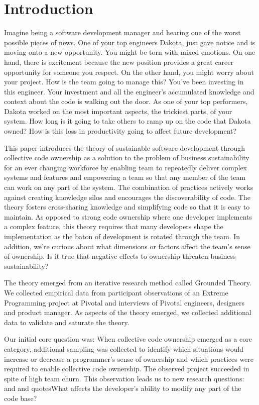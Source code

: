 
\section{Introduction}

Imagine being a software development manager and hearing one of the worst possible pieces of news.  One of your top engineers Dakota, just gave notice and is moving onto a new opportunity. You might be torn with mixed emotions. On one hand, there is excitement because the new position provides a great career opportunity for someone you respect. On the other hand, you might worry about your project. How is the team going to manage this? You've been investing in this engineer. Your investment and all the engineer's accumulated knowledge and context about the code is walking out the door.  As one of your top performers, Dakota worked on the most important aspects, the trickiest parts, of your system. How long is it going to take others to ramp up on the code that Dakota owned? How is this loss in productivity going to affect future development? 



This paper introduces the theory of sustainable software development through collective code ownership as a solution to the problem of business sustainability for an ever changing workforce by enabling team to repeatedly deliver complex systems and features and empowering a team so that any member of the team can work on any part of the system. The combination of practices actively works against creating knowledge silos and encourages the discoverability of code. The theory fosters cross-sharing knowledge and simplifying code so that it is easy to maintain. As opposed to strong code ownership where one developer implements a complex feature, this theory requires that many developers shape the implementation as the baton of development is rotated through the team. In addition, we're curious about what dimensions or factors affect the team's sense of ownership. Is it true that negative effects to ownership threaten business sustainability?

The theory emerged from an iterative research method called Grounded Theory. We collected empirical data from participant observations of an Extreme Programming project at Pivotal and interviews of Pivotal engineers, designers and product manager. As aspects of the theory emerged, we collected additional data to validate and saturate the theory.

Our initial core question was:  When collective code ownership emerged as a core category, additional sampling was collected to identify which situations would increase or decrease a programmer's sense of ownership and which practices were required to enable collective code ownership. The observed project succeeded in spite of high team churn. This observation leads us to new research questions:  and  and quotes{What affects the developer's ability to modify any part of the code base?}


